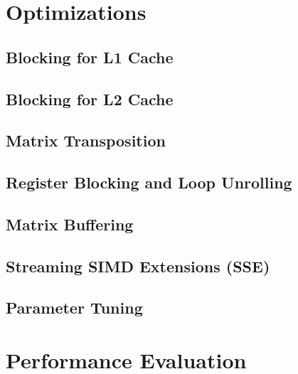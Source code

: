 \documentclass[12pt]{article}
\begin{document}
\section{Optimizations}

\subsection{Blocking for L1 Cache}

\subsection{Blocking for L2 Cache}

\subsection{Matrix Transposition}

\subsection{Register Blocking and Loop Unrolling}

\subsection{Matrix Buffering}

\subsection{Streaming SIMD Extensions (SSE)}

\subsection{Parameter Tuning}

\section{Performance Evaluation}
\end{document}
